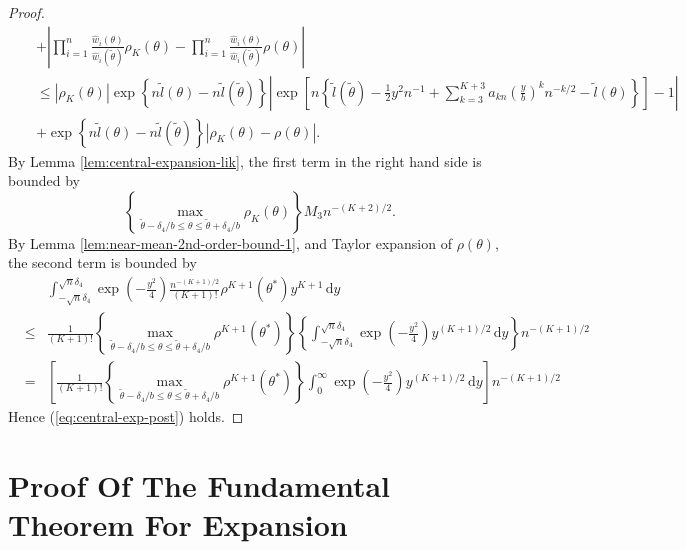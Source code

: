 \documentclass[oneside,english]{amsbook}
\numberwithin{section}{chapter}
\numberwithin{equation}{section}
\numberwithin{figure}{section}
\theoremstyle{plain}
\theoremstyle{plain}
\theoremstyle{definition}
\theoremstyle{plain}
\theoremstyle{plain}
\theoremstyle{remark}
\theoremstyle{definition}
\theoremstyle{definition}
\newcommand{\diff}{\,\mathrm{d}}
\begin{document}
\begin{proof}
\begin{eqnarray*}
 &  & +\left|\prod_{i=1}^{n}\frac{\hat{w}_{i}\left(\theta\right)}{\hat{w}_{i}\left(\tilde{\theta}\right)}\rho_{K}\left(\theta\right)-\prod_{i=1}^{n}\frac{\hat{w}_{i}\left(\theta\right)}{\hat{w}_{i}\left(\tilde{\theta}\right)}\rho\left(\theta\right)\right|\\
 &  & \le\left|\rho_{K}\left(\theta\right)\right|\exp\left\{ n\tilde{l}\left(\theta\right)-n\tilde{l}\left(\tilde{\theta}\right)\right\} \left|\exp\left[n\left\{ \tilde{l}\left(\tilde{\theta}\right)-\frac{1}{2}y^{2}n^{-1}+\sum_{k=3}^{K+3}a_{kn}\left(\frac{y}{b}\right)^{k}n^{-k/2}-\tilde{l}\left(\theta\right)\right\} \right]-1\right|\\
 &  & +\exp\left\{ n\tilde{l}\left(\theta\right)-n\tilde{l}\left(\tilde{\theta}\right)\right\} \left|\rho_{K}\left(\theta\right)-\rho\left(\theta\right)\right|.
\end{eqnarray*}
 By Lemma \ref{lem:central-expansion-lik}, the first term in the
right hand side is bounded by 
\[
\left\{ \max_{\tilde{\theta}-\delta_{4}/b\le\theta\le\tilde{\theta}+\delta_{4}/b}\rho_{K}\left(\theta\right)\right\} M_{3}n^{-\left(K+2\right)/2}.
\]
By Lemma \ref{lem:near-mean-2nd-order-bound-1}, and Taylor expansion
of $\rho\left(\theta\right)$, the second term is bounded by 
\begin{eqnarray*}
 &  & \int_{-\sqrt{n}\delta_{4}}^{\sqrt{n}\delta_{4}}\exp\left(-\frac{y^{2}}{4}\right)\frac{n^{-\left(K+1\right)/2}}{\left(K+1\right)!}\rho^{K+1}\left(\theta^{*}\right)y^{K+1}\diff y\\
 & \le & \frac{1}{\left(K+1\right)!}\left\{ \max_{\tilde{\theta}-\delta_{4}/b\le\theta\le\tilde{\theta}+\delta_{4}/b}\rho^{K+1}\left(\theta^{*}\right)\right\} \left\{ \int_{-\sqrt{n}\delta_{4}}^{\sqrt{n}\delta_{4}}\exp\left(-\frac{y^{2}}{4}\right)y^{\left(K+1\right)/2}\diff y\right\} n^{-\left(K+1\right)/2}\\
 & = & \left[\frac{1}{\left(K+1\right)!}\left\{ \max_{\tilde{\theta}-\delta_{4}/b\le\theta\le\tilde{\theta}+\delta_{4}/b}\rho^{K+1}\left(\theta^{*}\right)\right\} \int_{0}^{\infty}\exp\left(-\frac{y^{2}}{4}\right)y^{\left(K+1\right)/2}\diff y\right]n^{-\left(K+1\right)/2}
\end{eqnarray*}
Hence (\ref{eq:central-exp-post}) holds. %

\end{proof}

\section{Proof Of The Fundamental Theorem For Expansion}\label{app-proof-fun-thm}
\end{document}
